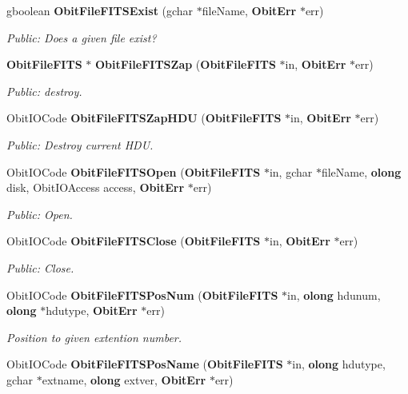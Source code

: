 \begin{CompactItemize}
gboolean {\bf Obit\-File\-FITSExist} (gchar $\ast$file\-Name, {\bf Obit\-Err} $\ast$err)
\begin{CompactList}\small\item\em Public: Does a given file exist? \item\end{CompactList}\item 
{\bf Obit\-File\-FITS} $\ast$ {\bf Obit\-File\-FITSZap} ({\bf Obit\-File\-FITS} $\ast$in, {\bf Obit\-Err} $\ast$err)
\begin{CompactList}\small\item\em Public: destroy. \item\end{CompactList}\item 
Obit\-IOCode {\bf Obit\-File\-FITSZap\-HDU} ({\bf Obit\-File\-FITS} $\ast$in, {\bf Obit\-Err} $\ast$err)
\begin{CompactList}\small\item\em Public: Destroy current HDU. \item\end{CompactList}\item 
Obit\-IOCode {\bf Obit\-File\-FITSOpen} ({\bf Obit\-File\-FITS} $\ast$in, gchar $\ast$file\-Name, {\bf olong} disk, Obit\-IOAccess access, {\bf Obit\-Err} $\ast$err)
\begin{CompactList}\small\item\em Public: Open. \item\end{CompactList}\item 
Obit\-IOCode {\bf Obit\-File\-FITSClose} ({\bf Obit\-File\-FITS} $\ast$in, {\bf Obit\-Err} $\ast$err)
\begin{CompactList}\small\item\em Public: Close. \item\end{CompactList}\item 
Obit\-IOCode {\bf Obit\-File\-FITSPos\-Num} ({\bf Obit\-File\-FITS} $\ast$in, {\bf olong} hdunum, {\bf olong} $\ast$hdutype, {\bf Obit\-Err} $\ast$err)
\begin{CompactList}\small\item\em Position to given extention number. \item\end{CompactList}\item 
Obit\-IOCode {\bf Obit\-File\-FITSPos\-Name} ({\bf Obit\-File\-FITS} $\ast$in, {\bf olong} hdutype, gchar $\ast$extname, {\bf olong} extver, {\bf Obit\-Err} $\ast$err)

\end{CompactItemize}
